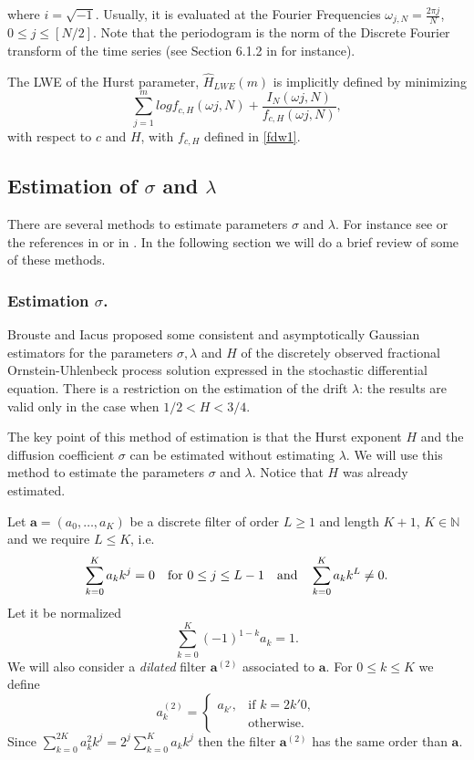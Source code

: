 \documentclass[smallextended]{svjour3}
\newcommand{\IN}{{\mathbb N}}
\begin{document}
where $i=\sqrt{-1}$. Usually, it is evaluated at the Fourier Frequencies
$\omega_{j,N} = \frac{2\pi j}{N}$, $0 \le j \le [N/2]$.  Note that the
periodogram is the norm of the Discrete Fourier transform of the time series
(see Section 6.1.2 in \cite{priestley} for instance).


The LWE of the Hurst parameter, $\hat{H}_{LWE}(m)$  is implicitly defined by
minimizing
$$
\sum_{j=1}^m  log f_{c,H} (\omega j,N ) + \frac{I_N(\omega j, N)}{ f_{c,H}
(\omega j,N )},
$$
with respect to $c$ and $H$, with $f_{c,H}$ defined in \eqref{fdw1}.



\subsection{Estimation of $\sigma$ and  $\lambda$}



There are several methods to estimate parameters $\sigma$ and  $\lambda$. For
instance see \cite{ra} or the references in \cite{ne-ti} or in \cite{ku-mi}. In
the following section we will do a brief review of
some of these methods.


\subsubsection{Estimation $\sigma$.}
\label{sect-est}



Brouste and Iacus \cite{br-ia} proposed some consistent and asymptotically
Gaussian estimators for the parameters $\sigma,\lambda$ and $H$ of
the discretely observed fractional Ornstein-Uhlenbeck process solution
expressed in the stochastic differential equation.
There is a restriction on  the estimation of the drift $\lambda$: the
results are valid only in the case when $1/2<H<3/4$. 

The key point of this method of estimation is that the Hurst exponent $H$ and
the diffusion coefficient $\sigma $ can be estimated without
estimating $\lambda$.  We will use this method to estimate the parameters
$\sigma$ and $\lambda$. Notice that $H$ was already estimated.



Let $\bm{a} = (a_0,\ldots, a_K )$ be a discrete filter of order $L\ge 1$ and
length $K+1$, $K \in\IN$ and we require  $L\le K$, i.e.
\[
\sum_{k=0}^K a_k k^j =0 \quad \hbox{\rm  for } 0\le j\le L-1 \quad\hbox{\rm
and}\quad  \sum_{k=0}^K a_k k^L \ne 0.
\]
Let it be normalized
\[
\sum_{k=0}^K (-1)^{1-k} a_k =1.
\]
We will also consider a {\it dilated} filter $\bm{a}^{(2)}$ associated to
$\bm{a}$. For $0\le k\le K$ we define
\[
a_k^{(2)} = 
    \begin{cases} a_{k'}, & \mbox{if } k=2k' 0,
    \\
     & \mbox{otherwise.}
\end{cases}
\]
Since $\sum_{k=0}^{2K} a_k^2 k^j=2^j \sum_{k=0}^K a_k k^j $ then the filter
$\bm{a}^{(2)}$ has the same order than  $\bm{a}$.
\end{document}
